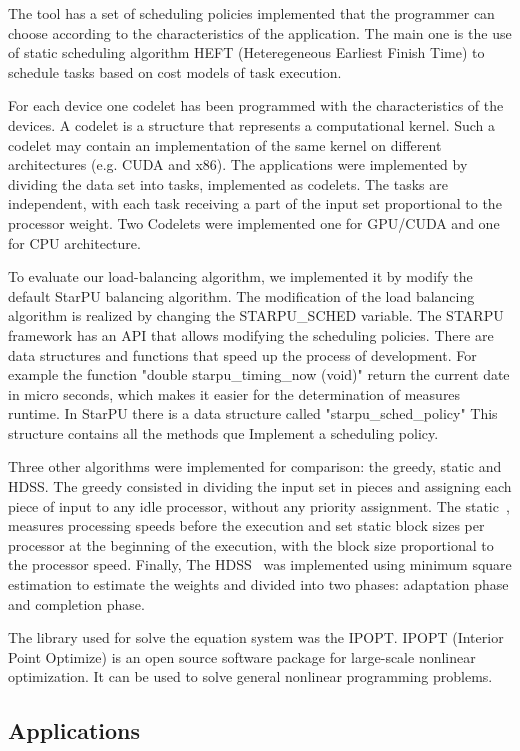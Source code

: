 \documentclass[journal]{IEEEtran}
\begin{document}
The tool has a set of scheduling policies implemented that the programmer can
choose according to the characteristics of the application. The main one is the
use of static scheduling algorithm HEFT (Heteregeneous Earliest Finish Time) to
schedule tasks based on cost models of task execution.

For each device one codelet has been programmed with the characteristics of the
devices. A codelet is a structure that represents a computational kernel. Such a
codelet may contain an implementation of the same kernel on different
architectures (e.g. CUDA and x86).  The applications were implemented by
dividing the data set into tasks, implemented as codelets. The tasks are
independent, with each task receiving a part of the input set proportional to
the processor weight. Two Codelets were implemented one for GPU/CUDA and one for
CPU architecture.

To evaluate our load-balancing algorithm, we implemented it by modify the default StarPU balancing algorithm. The modification of the load balancing algorithm is realized by changing the STARPU\_SCHED variable. The STARPU framework has an API that allows modifying the scheduling policies. There are data structures and functions that speed up the process of development. For example the function "double starpu\_timing\_now (void)"  return the current date in micro seconds, which makes it easier for the determination of measures runtime. In StarPU there is a data structure called "starpu\_sched\_policy" This structure contains all the methods que Implement a scheduling policy. 

Three other algorithms were implemented for comparison: the greedy, static and
HDSS. The greedy consisted in dividing the input set in pieces and assigning
each piece of input to any idle processor, without any priority assignment. The
static~\cite{raphael}, measures processing speeds before the execution and set
static block sizes per processor at the beginning of the execution, with the
block size proportional to the processor speed. Finally, The HDSS~\cite{HDSS}
was implemented using minimum square estimation to estimate the weights and
divided into two phases: adaptation phase and completion phase.

The library used for solve the equation system was the IPOPT. IPOPT (Interior Point Optimize) is an open source software package for large-scale nonlinear optimization. It can be used to solve general nonlinear programming problems.

\subsection{Applications}
\end{document}
